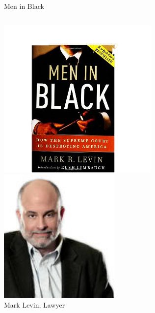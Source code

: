\begin{frame}{Men in Black}
    \begin{columns}[onlytextwidth]
            \centering
            \includegraphics[width=\textwidth]{img/men-in-black.png} \\

            \centering
            \includegraphics[width=0.75\textwidth]{img/mark-levin.png} \\
            Mark Levin, Lawyer \\
    \end{columns}
\end{frame}


